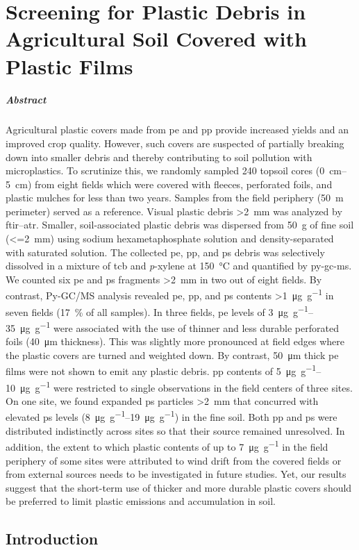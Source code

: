 
\chapter{Screening for Plastic Debris in Agricultural Soil Covered with Plastic Films}
\label{ch:screening}

\paragraph{Abstract} Agricultural plastic covers made from \ac{pe} and \ac{pp} provide increased yields and an improved crop quality. However, such covers are suspected of partially breaking down into smaller debris and thereby contributing to soil pollution with microplastics. To scrutinize this, we randomly sampled 240 topsoil cores (\SIrange{0}{5}{\centi\meter}) from eight fields which were covered with fleeces, perforated foils, and plastic mulches for less than two years. Samples from the field periphery (\SI{50}{\meter} perimeter) served as a reference. Visual plastic debris \SI{>2}{\milli\meter} was analyzed by \ac{ftir}--\ac{atr}. Smaller, soil-associated plastic debris was dispersed from \SI{50}{\gram} of fine soil (\SI{<=2}{\milli\meter}) using sodium hexametaphosphate solution and density-separated with saturated  solution. The collected \ac{pe}, \ac{pp}, and \ac{ps} debris was selectively dissolved in a mixture of \ac{tcb} and \textit{p}-xylene at \SI{150}{\degreeCelsius} and quantified by \ac{py-gc-ms}. We counted six \ac{pe} and \ac{ps} fragments \SI{>2}{\milli\meter} in two out of eight fields. By contrast, Py-GC/MS analysis revealed \ac{pe}, \ac{pp}, and \ac{ps} contents \SI{>1}{\micro\gram\per\gram} in seven fields (\SI{17}{\percent} of all samples). In three fields, \ac{pe} levels of \SIrange{3}{35}{\micro\gram\per\gram} were associated with the use of thinner and less durable perforated foils (\SI{40}{\micro\meter} thickness). This was slightly more pronounced at field edges where the plastic covers are turned and weighted down. By contrast, \SI{50}{\micro\meter} thick \ac{pe} films were not shown to emit any plastic debris. \Ac{pp} contents of \SIrange{5}{10}{\micro\gram\per\gram} were restricted to single observations in the field centers of three sites. On one site, we found expanded \ac{ps} particles \SI{>2}{\milli\meter} that concurred with elevated \ac{ps} levels (\SIrange{8}{19}{\micro\gram\per\gram}) in the fine soil. Both \ac{pp} and \ac{ps} were distributed indistinctly across sites so that their source remained unresolved. In addition, the extent to which plastic contents of up to \SI{7}{\micro\gram\per\gram} in the field periphery of some sites were attributed to wind drift from the covered fields or from external sources needs to be investigated in future studies. Yet, our results suggest that the short-term use of thicker and more durable plastic covers should be preferred to limit plastic emissions and accumulation in soil.

\section{Introduction}